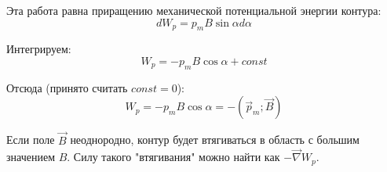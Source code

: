 \documentclass{article}
\begin{document}
	Эта работа равна приращению механической потенциальной энергии контура:
	\begin{equation}
		dW_p = p_mB\sin\alpha d\alpha
	\end{equation}

	Интегрируем:
	\begin{equation}
		W_p = -p_mB\cos\alpha + const
	\end{equation}

	Отсюда (принято считать $const=0$):
	\begin{equation}
		W_p = -p_mB\cos\alpha = -(\vec p_m;\vec B)
	\end{equation}

	Если поле $\vec B$ неоднородно, контур будет втягиваться в область с большим значением $B$. Силу такого "втягивания" можно найти как $-\vec\nabla W_p$.
\end{document}
